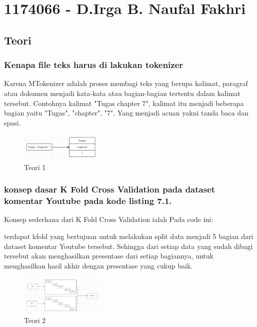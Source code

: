 \section{1174066 - D.Irga B. Naufal Fakhri}
\subsection{Teori}
\subsubsection{Kenapa file teks harus di lakukan tokenizer}
\hfill\break
Karena MTokenizer adalah proses membagi teks yang berupa kalimat, paragraf atau dokumen menjadi kata-kata atau bagian-bagian tertentu dalam kalimat tersebut. Contohnya kalimat "Tugas chapter 7", kalimat itu menjadi beberapa bagian yaitu "Tugas", "chapter", "7". Yang menjadi acuan yakni tanda baca dan spasi.
\begin{figure}[H]
\centering
	\includegraphics[width=4cm]{figures/1174066/7/1.jpg}
\caption{Teori 1}
\end{figure}

\subsubsection{konsep dasar K Fold Cross Validation pada dataset komentar Youtube pada kode listing 7.1.}
\hfill\break
Konsep sederhana dari K Fold Cross Validation ialah Pada code ini:

terdapat kfold yang bertujuan untuk melakukan split data menjadi 5 bagian dari dataset komentar Youtube tersebut. Sehingga dari setiap data yang sudah dibagi tersebut akan menghasilkan presentase dari setiap bagiannya, untuk menghasilkan hasil akhir dengan presentase yang cukup baik.
\begin{figure}[H]
\centering
	\includegraphics[width=4cm]{figures/1174066/7/2.jpg}
\caption{Teori 2}
\end{figure}

